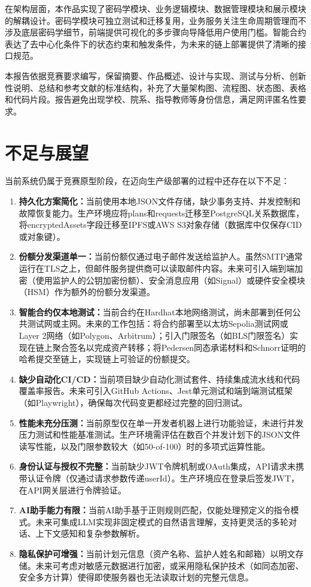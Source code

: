 \documentclass[UTF8,a4paper,zihao=-4,openany]{ctexrep}
\begin{document}
在架构层面，本作品实现了密码学模块、业务逻辑模块、数据管理模块和展示模块的解耦设计。密码学模块可独立测试和迁移复用，业务服务关注生命周期管理而不涉及底层密码学细节，前端提供可视化的多步骤向导降低用户使用门槛。智能合约表达了去中心化条件下的状态约束和触发条件，为未来的链上部署提供了清晰的接口规范。

本报告依据竞赛要求编写，保留摘要、作品概述、设计与实现、测试与分析、创新性说明、总结和参考文献的标准结构，补充了大量架构图、流程图、状态图、表格和代码片段。报告避免出现学校、院系、指导教师等身份信息，满足网评匿名性要求。

\section{不足与展望}

当前系统仍属于竞赛原型阶段，在迈向生产级部署的过程中还存在以下不足：

\begin{enumerate}
  \item \textbf{持久化方案简化：}当前使用本地JSON文件存储，缺少事务支持、并发控制和故障恢复能力。生产环境应将plans和requests迁移至PostgreSQL关系数据库，将encryptedAssets字段迁移至IPFS或AWS S3对象存储（数据库中仅保存CID或对象键）。
  \item \textbf{份额分发渠道单一：}当前份额仅通过电子邮件发送给监护人。虽然SMTP通常运行在TLS之上，但邮件服务提供商可以读取邮件内容。未来可引入端到端加密（使用监护人的公钥加密份额）、安全消息应用（如Signal）或硬件安全模块（HSM）作为额外的份额分发渠道。
  \item \textbf{智能合约仅本地测试：}当前合约在Hardhat本地网络测试，尚未部署到任何公共测试网或主网。未来的工作包括：将合约部署至以太坊Sepolia测试网或Layer 2网络（如Polygon、Arbitrum）；引入门限签名（如BLS门限签名）实现在链上聚合签名以完成资产转移；将Pedersen同态承诺材料和Schnorr证明的哈希提交至链上，实现链上可验证的份额提交。
  \item \textbf{缺少自动化CI/CD：}当前项目缺少自动化测试套件、持续集成流水线和代码覆盖率报告。未来可引入GitHub Actions、Jest单元测试和端到端测试框架（如Playwright），确保每次代码变更都经过完整的回归测试。
  \item \textbf{性能未充分压测：}当前原型仅在单一开发者机器上进行功能验证，未进行并发压力测试和性能基准测试。生产环境需评估在数百个并发计划下的JSON文件读写性能，以及门限参数较大（如50-of-100）时的多项式运算性能。
  \item \textbf{身份认证与授权不完整：}当前缺少JWT令牌机制或OAuth集成，API请求未携带认证令牌（仅通过请求参数传递userId）。生产环境应在登录后签发JWT，在API网关层进行令牌验证。
  \item \textbf{AI助手能力有限：}当前AI助手基于正则规则匹配，仅能处理预定义的指令模式。未来可集成LLM实现非固定模式的自然语言理解，支持更灵活的多轮对话、上下文感知和复杂参数解析。
  \item \textbf{隐私保护可增强：}当前计划元信息（资产名称、监护人姓名和邮箱）以明文存储。未来可考虑对敏感元数据进行加密，或采用隐私保护技术（如同态加密、安全多方计算）使得即使服务器也无法读取计划的完整元信息。
\end{enumerate}
\end{document}
